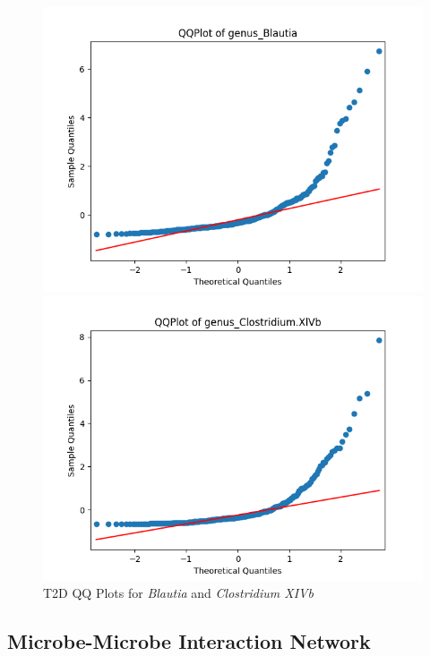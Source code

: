 \documentclass[12pt,letterpaper]{article}
\begin{document}
\begin{figure}[h!]
\begin{minipage}{0.47\linewidth}
  \centering
  \includegraphics[width=\linewidth]{../plots/t2d/normality/norm/genus_Blautia.png}
\end{minipage}%
\begin{minipage}{0.47\linewidth}
   \centering
   \includegraphics[width=\linewidth]{../plots/t2d/normality/norm/genus_Clostridium.XlVb.png}
\end{minipage}
\caption{T2D QQ Plots for \textit{Blautia} and \textit{Clostridium XIVb}}
\label{fig:t2dqqplots}
\end{figure}

\subsection{Microbe-Microbe Interaction Network}
\end{document}
